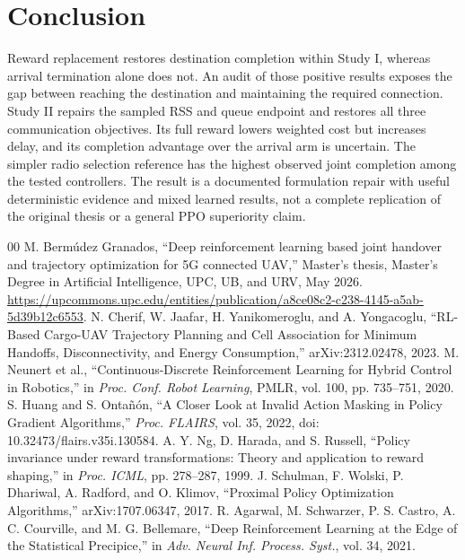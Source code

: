 \documentclass[conference]{IEEEtran}
\begin{document}
\section{Conclusion}
Reward replacement restores destination completion within Study I, whereas
arrival termination alone does not. An audit of those positive results exposes
the gap between reaching the destination and maintaining the required connection.
Study II repairs the sampled RSS and queue endpoint and restores all three
communication objectives. Its full reward lowers weighted cost but increases
delay, and its completion advantage over the arrival arm is uncertain. The
simpler radio selection reference has the highest observed joint completion
among the tested controllers. The result is a documented formulation repair
with useful deterministic evidence and mixed learned results, not a complete
replication of the original thesis or a general PPO superiority claim.

\begin{thebibliography}{00}
 M. Berm\'udez Granados, ``Deep reinforcement learning based joint
handover and trajectory optimization for 5G connected UAV,'' Master's thesis,
Master's Degree in Artificial Intelligence, UPC, UB, and URV, May 2026.
\url{https://upcommons.upc.edu/entities/publication/a8ce08c2-c238-4145-a5ab-5d39b12c6553}.
 N. Cherif, W. Jaafar, H. Yanikomeroglu, and A. Yongacoglu,
``RL-Based Cargo-UAV Trajectory Planning and Cell Association for Minimum
Handoffs, Disconnectivity, and Energy Consumption,'' arXiv:2312.02478, 2023.
 M. Neunert et al., ``Continuous-Discrete Reinforcement Learning
for Hybrid Control in Robotics,'' in \emph{Proc. Conf. Robot Learning},
PMLR, vol. 100, pp. 735--751, 2020.
 S. Huang and S. Onta\~n\'on, ``A Closer Look at Invalid Action
Masking in Policy Gradient Algorithms,'' \emph{Proc. FLAIRS}, vol. 35, 2022,
doi: 10.32473/flairs.v35i.130584.
 A. Y. Ng, D. Harada, and S. Russell, ``Policy invariance under
reward transformations: Theory and application to reward shaping,'' in
\emph{Proc. ICML}, pp. 278--287, 1999.
 J. Schulman, F. Wolski, P. Dhariwal, A. Radford, and O. Klimov,
``Proximal Policy Optimization Algorithms,'' arXiv:1707.06347, 2017.
 R. Agarwal, M. Schwarzer, P. S. Castro, A. C. Courville,
and M. G. Bellemare, ``Deep Reinforcement Learning at the Edge of the
Statistical Precipice,'' in \emph{Adv. Neural Inf. Process. Syst.}, vol. 34, 2021.
\end{thebibliography}

\end{document}

